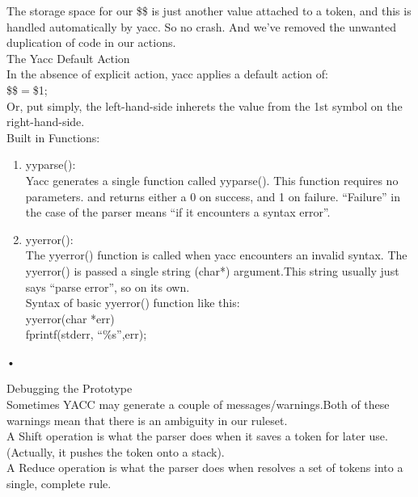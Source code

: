 \documentclass[11pt]{article}
\begin{document}
	\noindent
	The storage space for our \$\$ is just another value attached to a token, and this is handled automatically by yacc. So no crash. And we’ve removed the unwanted duplication of code in our actions.\\
	
	\noindent
	The Yacc Default Action\\
	In the absence of explicit action, yacc applies a default action of:\\
	{ \$\$$=$\$1; }\\
	Or, put simply, the left-hand-side inherets the value from the 1st symbol on the right-hand-side.\\
	
	\noindent
	Built in Functions:\\
	\begin{enumerate}
		\item yyparse():\\
		Yacc generates a single function called yyparse(). This function requires no parameters. and returns either a 0 on success, and 1 on failure. “Failure” in the case of the parser means “if it encounters a syntax error”.\\
		\item yyerror():\\
		The yyerror() function is called when yacc encounters an invalid syntax. The yyerror() is passed a single string (char*) argument.This string usually just says “parse error”, so on its own.\\
		Syntax of basic yyerror() function like this:\\
		yyerror(char *err)\\
		{ fprintf(stderr, “\%s”,err);\\
		}
	\end{enumerate}•
	
	\noindent
	Debugging the Prototype\\
	Sometimes YACC may generate a couple of messages/warnings.Both of these warnings mean that there is an ambiguity in our ruleset.\\
	A Shift operation is what the parser does when it saves a token for later use. (Actually, it pushes the token onto a stack).\\
	A Reduce operation is what the parser does when resolves a set of tokens into a single, complete rule.\\
	
\end{document}
